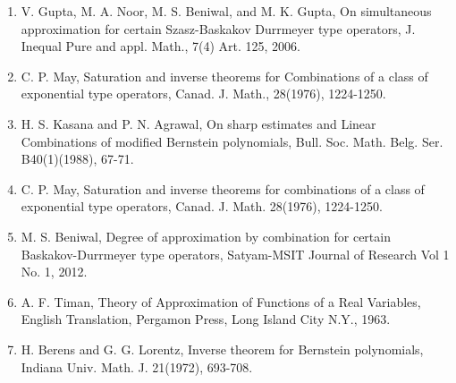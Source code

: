 \documentclass[12pt]{article}
\begin{document}
\begin{enumerate}
    \item V. Gupta, M. A. Noor, M. S. Beniwal, and M. K. Gupta, On simultaneous approximation for certain Szasz-Baskakov Durrmeyer type operators, J. Inequal Pure and appl. Math., 7(4) Art. 125, 2006.
    \item C. P. May, Saturation and inverse theorems for Combinations of a class of exponential type operators, Canad. J. Math., 28(1976), 1224-1250.
    \item H. S. Kasana and P. N. Agrawal, On sharp estimates and Linear Combinations of modified Bernstein polynomials, Bull. Soc. Math. Belg. Ser. B40(1)(1988), 67-71.
    \item C. P. May, Saturation and inverse theorems for combinations of a class of exponential type operators, Canad. J. Math. 28(1976), 1224-1250.
    \item M. S. Beniwal, Degree of approximation by combination for certain Baskakov-Durrmeyer type operators, Satyam-MSIT Journal of Research Vol 1 No. 1, 2012.
    \item A. F. Timan, Theory of Approximation of Functions of a Real Variables, English Translation, Pergamon Press, Long Island City N.Y., 1963.
    \item H. Berens and G. G. Lorentz, Inverse theorem for Bernstein polynomials, Indiana Univ. Math. J. 21(1972), 693-708.
\end{enumerate}
\end{document}
